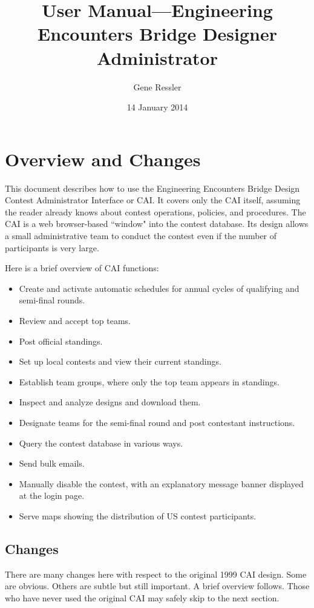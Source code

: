 \documentclass[11pt,letterpaper]{refart}
\title{User Manual---Engineering Encounters Bridge Designer Administrator}
\author{Gene Ressler}
\date{14 January 2014}
\begin{document}
\maketitle
\tableofcontents\newpage

\section{Overview and Changes}
This document describes how to use the Engineering Encounters Bridge Design Contest Administrator
Interface or CAI. It covers only the CAI itself, assuming the reader already knows
about contest operations, policies, and procedures. The CAI is a web browser-based 
``window" into the contest database. Its design allows a small administrative
team to conduct the contest even if the number of participants is very large. 

Here is a brief overview of CAI functions:
\begin{itemize}
\item Create and activate automatic schedules for annual cycles of qualifying and semi-final rounds.
\item Review and accept top teams.
\item Post official standings.
\item Set up local contests and view their current standings.
\item Establish team groups, where only the top team appears in standings.
\item Inspect and analyze designs and download them.
\item Designate teams for the semi-final round and post contestant instructions.
\item Query the contest database in various ways.
\item Send bulk emails.
\item Manually disable the contest, with an explanatory message banner displayed at
 the login page.
\item Serve maps showing the distribution of US contest participants.
\end{itemize}

\subsection{Changes}
There are many changes here with respect to the original 1999 CAI design. Some are
obvious. Others are subtle but still important. A brief overview follows. Those who
have never used the original CAI may safely skip to the next section.
\end{document}
